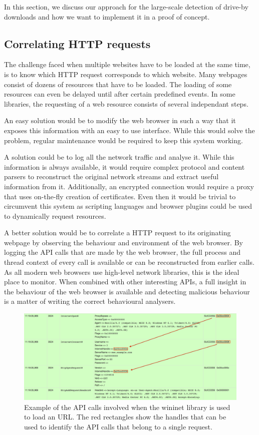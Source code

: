 In this section, we discuss our approach for the large-scale detection of drive-by downloads and how we want to implement it in a proof of concept.

\subsection{Correlating HTTP requests}

The challenge faced when multiple websites have to be loaded at the same time, is to know which HTTP request corresponds to which website. Many webpages consist of dozens of resources that have to be loaded. The loading of some resources can even be delayed until after certain predefined events. In some libraries, the requesting of a web resource consists of several independant steps.

An easy solution would be to modify the web browser in such a way that it exposes this information with an easy to use interface. While this would solve the problem, regular maintenance would be required to keep this system working. 

A solution could be to log all the network traffic and analyse it. While this information is always available, it would require complex protocol and content parsers to reconstruct the original network streams and extract useful information from it. Additionally, an encrypted connection would require a proxy that uses on-the-fly creation of certificates. Even then it would be trivial to circumvent this system as scripting languages and browser plugins could be used to dynamically request resources.

A better solution would be to correlate a HTTP request to its originating webpage by observing the behaviour and environment of the web browser. By logging the API calls that are made by the web browser, the full process and thread context of every call is available or can be reconstructed from earlier calls. As all modern web browsers use high-level network libraries, this is the ideal place to monitor. When combined with other interesting APIs, a full insight in the behaviour of the web browser is available and detecting malicious behaviour is a matter of writing the correct behavioural analysers.

\thispagestyle{empty}
\begin{figure}[h!]
    \centering
    \includegraphics[width=14.7cm]{Images/wininet.png}
    \caption{Example of the API calls involved when the wininet library is used to load an URL. The red rectangles show the handles that can be used to identify the API calls that belong to a single request.}
    \label{fig:wininet}
\end{figure}
\restoregeometry

